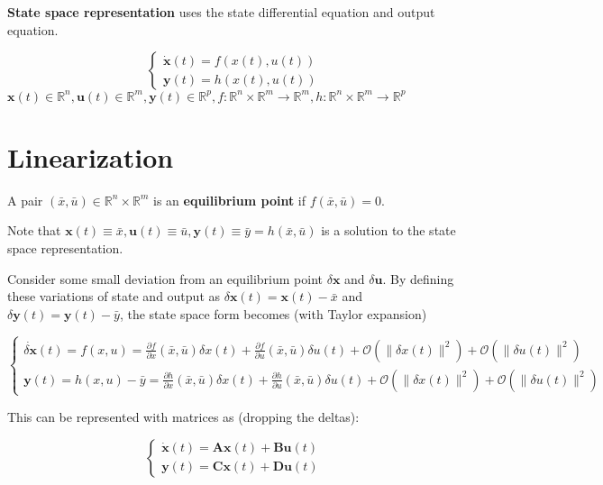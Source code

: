 \documentclass[11pt]{article}
\begin{document}
\textbf{State space representation} uses the state differential equation and output equation.
\begin{center}
$$
\begin{cases}
        \dot{\mathbf{x}}(t) = f(x(t), u(t)) \\
        \mathbf{y}(t) = h(x(t), u(t))
\end{cases}
$$
$\mathbf{x}(t) \in \mathbb{R}^{n}, \mathbf{u}(t) \in \mathbb{R}^{m},
\mathbf{y}(t) \in \mathbb{R}^{p}, f : \mathbb{R}^{n} \times \mathbb{R}^{m} \to \mathbb{R}^{m},
h: \mathbb{R}^{n} \times \mathbb{R}^{m} \to \mathbb{R}^{p}$
\end{center}
\section{Linearization}
\label{sec:orge61ed74}
A pair \((\bar{x}, \bar{u}) \in \mathbb{R}^{n} \times \mathbb{R}^{m}\) is an \textbf{equilibrium point}
if \(f(\bar{x}, \bar{u}) = 0\).

Note that \(\mathbf{x}(t) \equiv \bar{x}, \mathbf{u}(t) \equiv \bar{u}, \mathbf{y}(t) \equiv \bar{y} = h(\bar{x}, \bar{u})\)
is a solution to the state space representation.

Consider some small deviation from an equilibrium point \(\delta \mathbf{x}\) and \(\delta \mathbf{u}\).
By defining these variations of state and output as \(\delta \mathbf{x}(t) = \mathbf{x}(t) - \bar{x}\)
and \(\delta \mathbf{y}(t) = \mathbf{y}(t) - \bar{y}\), the state space form becomes (with Taylor expansion)
\begin{center}
$$
\begin{cases}
        \dot{\delta \mathbf{x}}(t) = f(x, u)
        = \frac{\partial f}{\partial x} ( \bar{x}, \bar{u} ) \delta x(t) + \frac{\partial f}{\partial u} ( \bar{x}, \bar{u} ) \delta u(t)
        + \mathcal{O} ( \| \delta x(t) \|^{2} ) + \mathcal{O} ( \| \delta u(t) \|^{2} )\\
        \mathbf{y}(t) = h(x, u) - \bar{y}
        = \frac{\partial h}{\partial x} ( \bar{x}, \bar{u} ) \delta x(t) + \frac{\partial h}{\partial u} ( \bar{x}, \bar{u} ) \delta u(t)
        + \mathcal{O} ( \| \delta x(t) \|^{2} ) + \mathcal{O} ( \| \delta u(t) \|^{2} )
\end{cases}
$$
\end{center}

This can be represented with matrices as (dropping the deltas):
\begin{center}
$$
\begin{cases}
        \dot{\mathbf{x}}(t) = \mathbf{Ax}(t) + \mathbf{Bu}(t) \\
        \mathbf{y}(t) = \mathbf{Cx}(t) + \mathbf{Du}(t)
\end{cases}
$$
\end{center}
\end{document}
